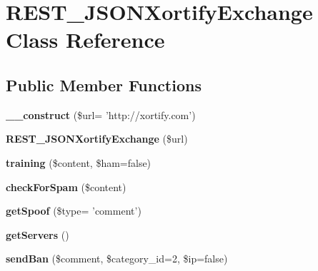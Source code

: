 \hypertarget{class_r_e_s_t___j_s_o_n_xortify_exchange}{\section{R\-E\-S\-T\-\_\-\-J\-S\-O\-N\-Xortify\-Exchange Class Reference}
\label{class_r_e_s_t___j_s_o_n_xortify_exchange}
}
\subsection*{Public Member Functions}
\begin{DoxyCompactItemize}
\item 
\hypertarget{class_r_e_s_t___j_s_o_n_xortify_exchange_af2264ce248dcef951c760af3ea8704c0}{{\bfseries \-\_\-\-\_\-construct} (\$url= 'http\-://xortify.\-com')}\label{class_r_e_s_t___j_s_o_n_xortify_exchange_af2264ce248dcef951c760af3ea8704c0}

\item 
\hypertarget{class_r_e_s_t___j_s_o_n_xortify_exchange_a74546ccfa2263f88e788fcb6a323ead9}{{\bfseries R\-E\-S\-T\-\_\-\-J\-S\-O\-N\-Xortify\-Exchange} (\$url)}\label{class_r_e_s_t___j_s_o_n_xortify_exchange_a74546ccfa2263f88e788fcb6a323ead9}

\item 
\hypertarget{class_r_e_s_t___j_s_o_n_xortify_exchange_aaf2d5218b1107825cc5a0b8be13b79b5}{{\bfseries training} (\$content, \$ham=false)}\label{class_r_e_s_t___j_s_o_n_xortify_exchange_aaf2d5218b1107825cc5a0b8be13b79b5}

\item 
\hypertarget{class_r_e_s_t___j_s_o_n_xortify_exchange_a13f6b7bdd8076137b2ffe061dcc759dd}{{\bfseries check\-For\-Spam} (\$content)}\label{class_r_e_s_t___j_s_o_n_xortify_exchange_a13f6b7bdd8076137b2ffe061dcc759dd}

\item 
\hypertarget{class_r_e_s_t___j_s_o_n_xortify_exchange_ae5cdbc6e9602356af3426f035e5cc1fc}{{\bfseries get\-Spoof} (\$type= 'comment')}\label{class_r_e_s_t___j_s_o_n_xortify_exchange_ae5cdbc6e9602356af3426f035e5cc1fc}

\item 
\hypertarget{class_r_e_s_t___j_s_o_n_xortify_exchange_a84c8d60b4c6f8fe8b6116d880c3fa66d}{{\bfseries get\-Servers} ()}\label{class_r_e_s_t___j_s_o_n_xortify_exchange_a84c8d60b4c6f8fe8b6116d880c3fa66d}

\item 
\hypertarget{class_r_e_s_t___j_s_o_n_xortify_exchange_a0aad35e1d17ff1488f96112b75979311}{{\bfseries send\-Ban} (\$comment, \$category\-\_\-id=2, \$ip=false)}\label{class_r_e_s_t___j_s_o_n_xortify_exchange_a0aad35e1d17ff1488f96112b75979311}


\end{DoxyCompactItemize}

